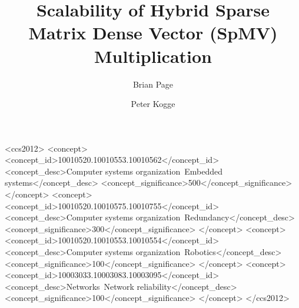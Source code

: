 \documentclass[sigconf]{acmart}
\begin{document}
\title{Scalability of Hybrid Sparse Matrix Dense Vector (SpMV) Multiplication}



\author{Brian Page}

\author{Peter Kogge}



\renewcommand{\shortauthors}{}


\begin{abstract}
	
\end{abstract}

%
%
\begin{CCSXML}
<ccs2012>
 <concept>
  <concept_id>10010520.10010553.10010562</concept_id>
  <concept_desc>Computer systems organization~Embedded systems</concept_desc>
  <concept_significance>500</concept_significance>
 </concept>
 <concept>
  <concept_id>10010520.10010575.10010755</concept_id>
  <concept_desc>Computer systems organization~Redundancy</concept_desc>
  <concept_significance>300</concept_significance>
 </concept>
 <concept>
  <concept_id>10010520.10010553.10010554</concept_id>
  <concept_desc>Computer systems organization~Robotics</concept_desc>
  <concept_significance>100</concept_significance>
 </concept>
 <concept>
  <concept_id>10003033.10003083.10003095</concept_id>
  <concept_desc>Networks~Network reliability</concept_desc>
  <concept_significance>100</concept_significance>
 </concept>
</ccs2012>  
\end{CCSXML}





\maketitle




 
\end{document}
